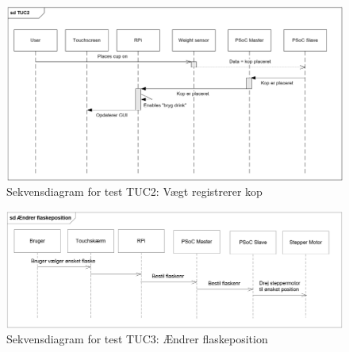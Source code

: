\begin{figure}[H]
	\centering
	\includegraphics[width=1\textwidth]{Images/TUC2.png}
	\caption{Sekvensdiagram for test TUC2: Vægt registrerer kop}
	\label{fig:testUC2}
\end{figure}

\begin{figure}[H]
	\centering
	\includegraphics[width=1\textwidth]{Images/sdTestUC3.png}
	\caption{Sekvensdiagram for test TUC3: Ændrer flaskeposition}
	\label{fig:testUC3}
\end{figure}

